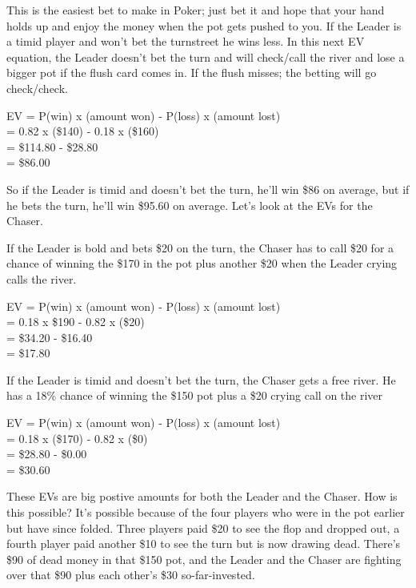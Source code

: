This is the easiest bet to make in Poker; just bet it and hope that
your hand holds up and enjoy the money when the pot gets pushed to
you. If the Leader is a timid player and won't bet the turnstreet
he wins less. In this next EV equation, the Leader doesn't bet the
turn and will check/call the river and lose a bigger pot if the flush
card comes in. If the flush misses; the betting will go check/check.

EV = P(win) x (amount won) - P(loss) x (amount lost) \\
   = 0.82   x (\$140)      - 0.18    x (\$160) \\
   = \$114.80 - \$28.80 \\
   = \$86.00

So if the Leader is timid and doesn't bet the turn, he'll win \$86 on
average, but if he bets the turn, he'll win \$95.60 on average. Let's
look at the EVs for the Chaser.

If the Leader is bold and bets \$20 on the turn, the Chaser
has to call \$20 for a chance of winning the \$170 in the pot plus
another \$20 when the Leader crying calls the river.

EV = P(win) x (amount won) - P(loss) x (amount lost) \\
   = 0.18 x \$190 - 0.82 x (\$20) \\
   = \$34.20 - \$16.40 \\
   = \$17.80

If the Leader is timid and doesn't bet the turn, the Chaser gets a
free river. He has a 18\% chance of winning the \$150 pot plus a \$20
crying call on the river

EV = P(win) x (amount won) - P(loss) x (amount lost) \\
   = 0.18 x (\$170) - 0.82 x (\$0) \\
   = \$28.80 - \$0.00 \\
   = \$30.60

These EVs are big postive amounts for both the Leader and the
Chaser. How is this possible? It's possible because of the four
players who were in the pot earlier but have since folded. Three
players paid \$20 to see the flop and dropped out, a fourth player
paid another \$10 to see the turn but is now drawing dead. There's
\$90 of dead money in that \$150 pot, and the Leader and the Chaser
are fighting over that \$90 plus each other's \$30 so-far-invested.

